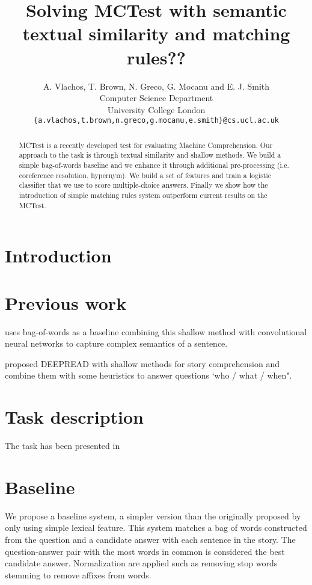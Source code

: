 \documentclass[11pt]{article}
\title{Solving MCTest with semantic textual similarity and matching rules??}
\author
       {A. Vlachos, T. Brown, N. Greco, G. Mocanu and E. J. Smith
       \\
       Computer Science Department\\
	University College London\\
       \tt{\{a.vlachos,t.brown,n.greco,g.mocanu,e.smith\}@cs.ucl.ac.uk}\\ 
       }
\date{}
\begin{document}
\maketitle
\begin{abstract}
MCTest is a recently developed test for evaluating Machine Comprehension. Our approach to the task is through textual similarity and shallow methods. We build a simple bag-of-words baseline and we enhance it through additional pre-processing (i.e. coreference resolution, hypernym). We build a set of features and train a logistic classifier that we use to score multiple-choice answers. Finally we show how the introduction of simple matching rules system outperform current results on the MCTest.
\end{abstract}

\section{Introduction}

\section{Previous work}

 uses bag-of-words as a baseline combining this shallow method with convolutional neural networks to capture complex semantics of a sentence.

 proposed D{\small EEP}R{\small EAD} with shallow methods for story comprehension and combine them with some heuristics to answer questions `who / what / when".

\section{Task description}

The task has been presented in  \cite{mctest}

\section{Baseline}
We propose a baseline system, a simpler version than the originally proposed by  only using simple lexical feature. This system matches a bag of words constructed from the question and a candidate answer with each sentence in the story. The question-answer pair with the most words in common is considered the best candidate answer. Normalization are applied such as removing stop words stemming to remove affixes from words.
\end{document}
